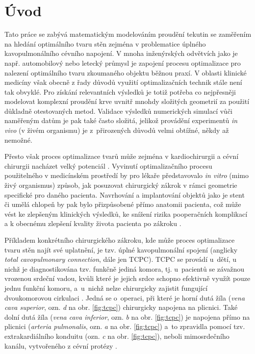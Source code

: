 
\chapter*{Úvod}


Tato práce se zabývá matematickým modelováním proudění tekutin se zaměřením na hledání optimálního tvaru stěn zejména v problematice úplného kavopulmonálního cévního napojení. V mnoha inženýrských odvětvích jako je např. automobilový nebo letecký průmysl je zapojení procesu optimalizace pro nalezení optimálního tvaru zkoumaného objektu běžnou praxí. V oblasti klinické medicíny však obecně z řady důvodů využití optimalizačních technik stále není tak obvyklé. Pro získání relevantních výsledků je totiž potřeba co nejpřesněji modelovat komplexní proudění krve uvnitř mnohdy složitých geometrií za použití důkladně otestovaných metod. Validace výsledků numerických simulací vůči naměřeným datům je pak také často složitá, jelikož provádění experimentů \textit{in vivo} (v živém organismu) je z~přirozených důvodů velmi obtížné, někdy až nemožné.

Přesto však proces optimalizace tvarů může zejména v kardiochirurgii a cévní chirurgii nacházet velký potenciál \cite{Abraham2005, Weddell2015, Marsden2008}. Vyvinutí optimalizačního procesu použitelného v medicínském prostředí by pro lékaře představovalo \textit{in vitro} (mimo živý organismus) způsob, jak posuzovat chirurgický zákrok v rámci geometrie specifické pro daného pacienta. Navrhování a implantování objektů jako je stent či umělá chlopeň by pak bylo přizpůsobené přímo anatomii pacienta, což může vést ke zlepšeným klinických výsledků, ke snížení rizika pooperačních komplikací a k obecnému zlepšení kvality života pacienta po zákroku \cite{Marsden2008}.

Příkladem konkrétního chirurgického zákroku, kde může proces optimalizace tvaru stěn najít své uplatnění, je tzv. úplné kavopulmonální spojení (anglicky \textit{total cavopulmonary connection}, dále jen TCPC). TCPC se provádí u~dětí, u nichž je diagnostikována tzv. funkčně jediná komora, tj. u~pacientů se závažnou vrozenou srdeční vadou, kvůli které je jejich srdce schopno efektivně využít pouze jednu funkční komoru, a~u~nichž nelze chirurgicky zajistit fungující dvoukomorovou cirkulaci \cite{Chaloup}. Jedná se o~operaci, při které je horní dutá žíla (\textit{vena cava superior}, ozn. \textit{d} na obr. \ref{fig:tcpc}) chirurgicky napojena na plicnici. Také dolní dutá žíla (\textit{vena cava inferior}, ozn. \textit{b} na obr. \ref{fig:tcpc}) je napojena přímo na plicnici (\textit{arteria pulmonalis}, ozn. \textit{a} na obr. \ref{fig:tcpc}) a~to zpravidla pomocí tzv. extrakardiálního konduitu (ozn. \textit{c} na obr. \ref{fig:tcpc}), neboli mimosrdečního kanálu, vytvořeného z cévní protézy \cite{Rubtsova, Delorme}. 

